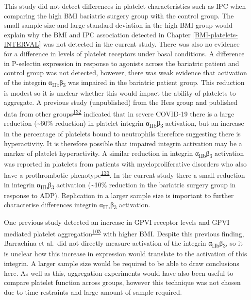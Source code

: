 \documentclass[11pt,twoside]{bristolthesis}
\begin{document}
This study did not detect differences in platelet characteristics such as IPC when comparing the high BMI bariatric surgery group with the control group. The small sample size and large standard deviation in the high BMI group would explain why the BMI and IPC association detected in Chapter \ref{BMI-platelets-INTERVAL} was not detected in the current study. There was also no evidence for a difference in levels of platelet receptors under basal conditions. A difference in P-selectin expression in response to agonists across the bariatric patient and control group was not detected, however, there was weak evidence that activation of the integrin α\textsubscript{IIb}β\textsubscript{3} was impaired in the bariatric patient group. This reduction is modest so it is unclear whether this would impact the ability of platelets to aggregate. A previous study (unpublished) from the Hers group and published data from other groups\textsuperscript{\protect\hyperlink{ref-Taus2020}{132}} indicated that in severe COVID-19 there is a large reduction (\textasciitilde60\% reduction) in platelet integrin α\textsubscript{IIb}β\textsubscript{3} activation, but an increase in the percentage of platelets bound to neutrophils therefore suggesting there is hyperactivity. It is therefore possible that impaired integrin activation may be a marker of platelet hyperactivity. A similar reduction in integrin α\textsubscript{IIb}β\textsubscript{3} activation was reported in platelets from patients with myeloproliferative disorders who also have a prothrombotic phenotype\textsuperscript{\protect\hyperlink{ref-Moore2013}{133}}. In the current study there a small reduction in integrin α\textsubscript{IIb}β\textsubscript{3} activation (\textasciitilde10\% reduction in the bariatric surgery group in response to ADP). Replication in a larger sample size is important to further characterise differences integrin α\textsubscript{IIb}β\textsubscript{3} activation.

One previous study detected an increase in GPVI receptor levels and GPVI mediated platelet aggregation\textsuperscript{\protect\hyperlink{ref-Barrachina2019}{105}} with higher BMI. Despite this previous finding, Barrachina et al.~did not directly measure activation of the integrin α\textsubscript{IIb}β\textsubscript{3}, so it is unclear how this increase in expression would translate to the activation of this integrin. A larger sample size would be required to be able to draw conclusions here. As well as this, aggregation experiments would have also been useful to compare platelet function across groups, however this technique was not chosen due to time restraints and large amount of sample required.
\end{document}
